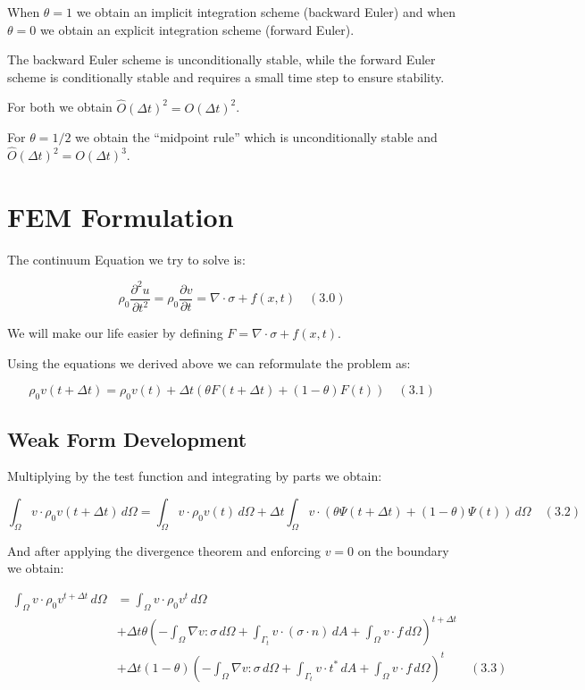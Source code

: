 \documentclass[
  11pt,
  a4paper,
]{scrbook}
\begin{document}
When \(\theta = 1\) we obtain an implicit integration scheme (backward
Euler) and when \(\theta = 0\) we obtain an explicit integration scheme
(forward Euler).

The backward Euler scheme is unconditionally stable, while the forward
Euler scheme is conditionally stable and requires a small time step to
ensure stability.

For both we obtain \(\hat{O}(\Delta t)^2 = O(\Delta t)^2\).

For \(\theta = 1/2\) we obtain the ``midpoint rule'' which is
unconditionally stable and \(\hat{O}(\Delta t)^2 = O(\Delta t)^3\).

\section{FEM Formulation}\label{fem-formulation}

The continuum Equation we try to solve is:

\[
\rho_0\frac{\partial^2 u}{\partial t^2} = \rho_0\frac{\partial v}{\partial t} = \nabla \cdot \sigma + f(x,t) \quad (3.0)
\]

We will make our life easier by defining
\(F=\nabla \cdot \sigma + f(x,t)\).

Using the equations we derived above we can reformulate the problem as:

\[
\rho_0v(t+\Delta t) = \rho_0v(t) + \Delta t(\theta F(t+\Delta t) + (1-\theta) F(t)) \quad (3.1)
\]

\subsection{Weak Form Development}\label{weak-form-development}

Multiplying by the test function and integrating by parts we obtain:

\[
\int_\Omega v \cdot \rho_0 v(t + \Delta t) \, d\Omega = \int_\Omega v \cdot \rho_0 v(t) \, d\Omega + \Delta t \int_\Omega v \cdot (\theta \Psi(t + \Delta t) + (1 - \theta) \Psi(t)) \, d\Omega \quad (3.2)
\]

And after applying the divergence theorem and enforcing \(v=0\) on the
boundary we obtain:

\[
\begin{aligned}
\int_\Omega v \cdot \rho_0 v^{t+\Delta t} \, d\Omega &= \int_\Omega v \cdot \rho_0 v^{t} \, d\Omega \\
&+ \Delta t \theta \left( -\int_\Omega \nabla v : \sigma \, d\Omega + \int_{\Gamma_t} v \cdot (\sigma \cdot n) \, dA + \int_\Omega v \cdot f \, d\Omega \right)^{t+\Delta t} \\
&+ \Delta t (1 - \theta) \left( -\int_\Omega \nabla v : \sigma \, d\Omega + \int_{\Gamma_t} v \cdot t^* \, dA + \int_\Omega v \cdot f \, d\Omega \right)^{t} \qquad (3.3)
\end{aligned}
\]
\end{document}
